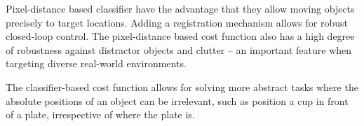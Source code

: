 Pixel-distance based classifier have the advantage that they allow moving objects precisely to target locations. Adding a registration mechanism allows for robust closed-loop control. The pixel-distance based cost function also has a high degree of robustness against distractor objects and clutter -- an important feature when targeting diverse real-world environments.

The classifier-based cost function allows for solving more abstract tasks where the absolute positions of an object can be irrelevant, such as position a cup in front of a plate, irrespective of where the plate is.

